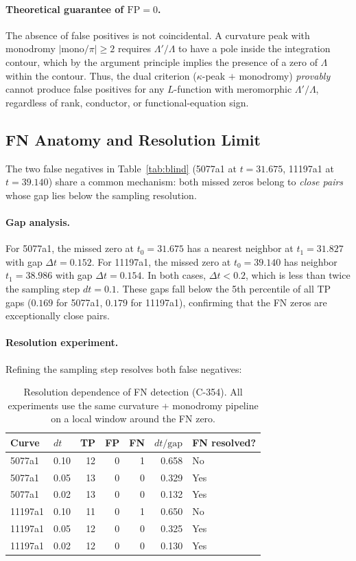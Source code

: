 \documentclass[11pt, a4paper]{article}
\theoremstyle{plain}
\theoremstyle{definition}
\begin{document}
\paragraph{Theoretical guarantee of $\mathrm{FP}=0$.}
The absence of false positives is not coincidental.  A curvature peak
with monodromy $|\mathrm{mono}/\pi| \geq 2$ requires $\Lambda'/\Lambda$
to have a pole inside the integration contour, which by the argument
principle implies the presence of a zero of $\Lambda$ within the
contour.  Thus, the dual criterion ($\kappa$-peak $+$ monodromy)
\emph{provably} cannot produce false positives for any $L$-function
with meromorphic $\Lambda'/\Lambda$, regardless of rank, conductor,
or functional-equation sign.


\subsection{FN Anatomy and Resolution Limit}
\label{ssec:fnanatomy}

The two false negatives in Table~\ref{tab:blind} (5077a1 at
$t=31.675$, 11197a1 at $t=39.140$) share a common mechanism:
both missed zeros belong to \emph{close pairs} whose gap lies below
the sampling resolution.

\paragraph{Gap analysis.}
For 5077a1, the missed zero at $t_{0}=31.675$ has a nearest neighbor
at $t_{1}=31.827$ with gap $\Delta t = 0.152$.  For 11197a1, the
missed zero at $t_{0}=39.140$ has neighbor $t_{1}=38.986$ with gap
$\Delta t = 0.154$.  In both cases, $\Delta t < 0.2$, which is less
than twice the sampling step $dt=0.1$.  These gaps fall below the
5th percentile of all TP gaps ($0.169$ for 5077a1, $0.179$ for
11197a1), confirming that the FN zeros are exceptionally close pairs.

\paragraph{Resolution experiment.}
Refining the sampling step resolves both false negatives:

\begin{table}[ht]
\centering
\caption{Resolution dependence of FN detection (C-354).  All experiments
  use the same curvature + monodromy pipeline on a local window around
  the FN zero.}
\label{tab:resolution}
\small
\begin{tabular}{llrrrrl}
\toprule
Curve & $dt$ & TP & FP & FN & $dt/\mathrm{gap}$ & FN resolved? \\
\midrule
5077a1  & 0.10 & 12 & 0 & 1 & 0.658 & No \\
5077a1  & 0.05 & 13 & 0 & 0 & 0.329 & Yes \\
5077a1  & 0.02 & 13 & 0 & 0 & 0.132 & Yes \\
\midrule
11197a1 & 0.10 & 11 & 0 & 1 & 0.650 & No \\
11197a1 & 0.05 & 12 & 0 & 0 & 0.325 & Yes \\
11197a1 & 0.02 & 12 & 0 & 0 & 0.130 & Yes \\
\bottomrule
\end{tabular}
\end{table}
\end{document}
